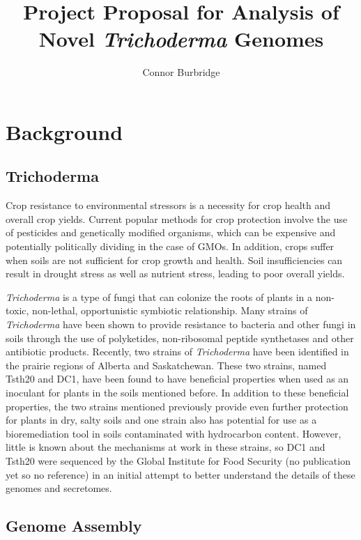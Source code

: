 \documentclass[12pt]{article}
\title{Project Proposal for Analysis of Novel \textit{Trichoderma} Genomes}
\author{Connor Burbridge}
\affil{USask NSID: cbe453 \\
  USask ID no.\ 11162928 \\
  Supervisors: Dave Schneider \& Tony Kusalik\\}
\begin{document}
\parindent=14pt
\maketitle

\clearpage
\tableofcontents
\clearpage

\section{Background}

\subsection{Trichoderma}

Crop resistance to environmental stressors is a necessity for crop
health and overall crop yields. Current popular methods for crop
protection involve the use of pesticides and genetically modified
organisms, which can be expensive and potentially politically dividing
in the case of GMOs\cite{GMO}. In addition, crops suffer when soils
are not sufficient for crop growth and health. Soil insufficiencies
can result in drought stress as well as nutrient stress, leading to
poor overall yields.

\textit{Trichoderma} is a type of fungi that can colonize the roots of
plants in a non-toxic, non-lethal, opportunistic symbiotic
relationship\cite{Trichoderma}. Many strains of \textit{Trichoderma}
have been shown to provide resistance to bacteria and other fungi in
soils through the use of polyketides, non-ribosomal peptide
synthetases and other antibiotic
products\cite{Trichoderma}\cite{Secretome}. Recently, two strains of
\textit{Trichoderma} have been identified in the prairie regions of
Alberta and Saskatchewan. These two strains, named Tsth20 and DC1,
have been found to have beneficial properties when used as an
inoculant for plants in the soils mentioned before. In addition to
these beneficial properties, the two strains mentioned previously
provide even further protection for plants in dry, salty soils and one
strain also has potential for use as a bioremediation tool in soils
contaminated with hydrocarbon content. However, little is known about
the mechanisms at work in these strains, so DC1 and Tsth20 were
sequenced by the Global Institute for Food Security (no publication
yet so no reference) in an initial attempt to better understand the
details of these genomes and secretomes.

\subsection{Genome Assembly}
\end{document}
